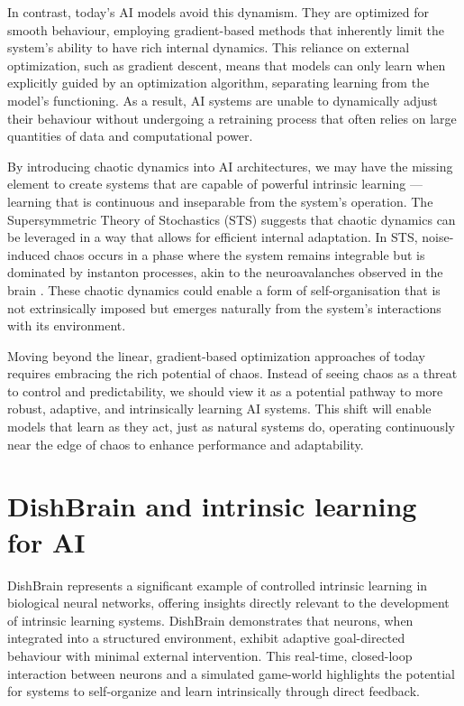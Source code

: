 \documentclass{article}
\begin{document}
In contrast, today's AI models avoid this dynamism. They are optimized
for smooth behaviour, employing gradient-based methods that inherently
limit the system's ability to have rich internal dynamics.  This reliance
on external optimization, such as gradient descent, means that models
can only learn when explicitly guided by an optimization algorithm,
separating learning from the model's functioning. As a result, AI systems
are unable to dynamically adjust their behaviour without undergoing a
retraining process that often relies on large quantities of data and
computational power.

By introducing chaotic dynamics into AI architectures, we may have the missing element to
create systems that are capable of powerful intrinsic learning --- learning
that is continuous and inseparable from the system's operation. The
Supersymmetric Theory of Stochastics (STS) suggests that chaotic
dynamics can be leveraged in a way that allows for efficient internal adaptation.
In STS, noise-induced chaos occurs in a phase where the system remains integrable but is dominated
by instanton processes, akin to the neuroavalanches observed in the
brain \cite{ovchinnikov2021}. These chaotic dynamics could enable a form of
self-organisation that is not extrinsically imposed but emerges naturally
from the system's interactions with its environment.

Moving beyond the linear, gradient-based optimization approaches of
today requires embracing the rich potential of chaos. Instead of seeing
chaos as a threat to control and predictability, we should view it as a
potential pathway to more robust, adaptive, and intrinsically learning
AI systems. This shift will enable models that learn as they act, just
as natural systems do, operating continuously near the edge of chaos to
enhance performance and adaptability.


\section{DishBrain and intrinsic learning for AI}

DishBrain \cite{Kagan2022} represents a significant example of
controlled intrinsic learning in biological neural networks, offering
insights directly relevant to the development of intrinsic learning
systems. DishBrain demonstrates that neurons, when integrated into a
structured environment, exhibit adaptive goal-directed behaviour with
minimal external intervention. This real-time, closed-loop interaction
between neurons and a simulated game-world highlights the potential for
systems to self-organize and learn intrinsically through direct feedback.
\end{document}
